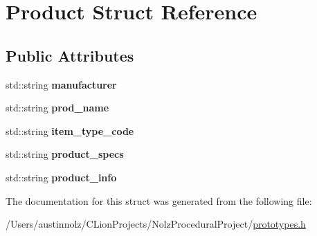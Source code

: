 \hypertarget{struct_product}{}\section{Product Struct Reference}
\label{struct_product}
\subsection*{Public Attributes}
\begin{DoxyCompactItemize}
\item 
\mbox{\label{struct_product_af3d21858bb34986f54309b877678daa8}} 
std\+::string {\bfseries manufacturer}
\item 
\mbox{\label{struct_product_aa4ea39ed4d2294851a2facc309076c98}} 
std\+::string {\bfseries prod\+\_\+name}
\item 
\mbox{\label{struct_product_a69176a940f74c91e008067a4a5409078}} 
std\+::string {\bfseries item\+\_\+type\+\_\+code}
\item 
\mbox{\label{struct_product_aedad84db3b4945b280df972c808daf98}} 
std\+::string {\bfseries product\+\_\+specs}
\item 
\mbox{\label{struct_product_abf79718a93e0d512bca3824aa05db0f5}} 
std\+::string {\bfseries product\+\_\+info}
\end{DoxyCompactItemize}


The documentation for this struct was generated from the following file\+:\begin{DoxyCompactItemize}
\item 
/\+Users/austinnolz/\+C\+Lion\+Projects/\+Nolz\+Procedural\+Project/\mbox{\hyperlink{prototypes_8h}{prototypes.\+h}}\end{DoxyCompactItemize}
